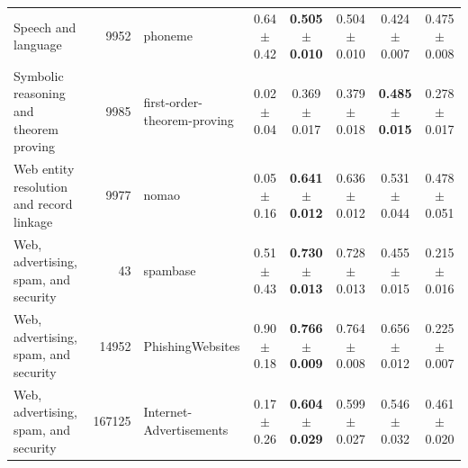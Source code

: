 \begin{table}[!tbp]
\begin{tabular}{lrlccccc}
        Speech and language & 9952 & phoneme & 0.64 $\pm$ 0.42 & \textbf{0.505 $\pm$ 0.010} & 0.504 $\pm$ 0.010 & 0.424 $\pm$ 0.007 & 0.475 $\pm$ 0.008 \\
        Symbolic reasoning and theorem proving & 9985 & first-order-theorem-proving & 0.02 $\pm$ 0.04 & 0.369 $\pm$ 0.017 & 0.379 $\pm$ 0.018 & \textbf{0.485 $\pm$ 0.015} & 0.278 $\pm$ 0.017 \\
        Web entity resolution and record linkage & 9977 & nomao & 0.05 $\pm$ 0.16 & \textbf{0.641 $\pm$ 0.012} & 0.636 $\pm$ 0.012 & 0.531 $\pm$ 0.044 & 0.478 $\pm$ 0.051 \\
        Web, advertising, spam, and security & 43 & spambase & 0.51 $\pm$ 0.43 & \textbf{0.730 $\pm$ 0.013} & 0.728 $\pm$ 0.013 & 0.455 $\pm$ 0.015 & 0.215 $\pm$ 0.016 \\
        Web, advertising, spam, and security & 14952 & PhishingWebsites & 0.90 $\pm$ 0.18 & \textbf{0.766 $\pm$ 0.009} & 0.764 $\pm$ 0.008 & 0.656 $\pm$ 0.012 & 0.225 $\pm$ 0.007 \\
        Web, advertising, spam, and security & 167125 & Internet-Advertisements & 0.17 $\pm$ 0.26 & \textbf{0.604 $\pm$ 0.029} & 0.599 $\pm$ 0.027 & 0.546 $\pm$ 0.032 & 0.461 $\pm$ 0.020 \\
        \bottomrule
    \end{tabular}%
\end{table}

